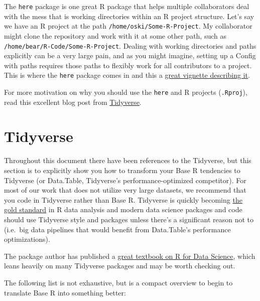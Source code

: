 \documentclass[
]{book}
\begin{document}
The \texttt{here} package is one great R package that helps multiple collaborators deal with the mess that is working directories within an R project structure. Let's say we have an R project at the path \texttt{/home/oski/Some-R-Project}. My collaborator might clone the repository and work with it at some other path, such as \texttt{/home/bear/R-Code/Some-R-Project}. Dealing with working directories and paths explicitly can be a very large pain, and as you might imagine, setting up a Config with paths requires those paths to flexibly work for all contributors to a project. This is where the \texttt{here} package comes in and this a \href{https://github.com/jennybc/here_here}{great vignette describing it}.

For more motivation on why you should use the \texttt{here} and R projects (\texttt{.Rproj}), read this excellent blog post from \href{https://www.tidyverse.org/articles/2017/12/workflow-vs-script/}{Tidyverse}.

\hypertarget{tidyverse}{%
\section{Tidyverse}\label{tidyverse}}

Throughout this document there have been references to the Tidyverse, but this section is to explicitly show you how to transform your Base R tendencies to Tidyverse (or Data.Table, Tidyverse's performance-optimized competitor). For most of our work that does not utilize very large datasets, we recommend that you code in Tidyverse rather than Base R. Tidyverse is quickly becoming \href{https://rviews.rstudio.com/2017/06/08/what-is-the-tidyverse/}{the gold standard} in R data analysis and modern data science packages and code should use Tidyverse style and packages unless there's a significant reason not to (i.e.~big data pipelines that would benefit from Data.Table's performance optimizations).

The package author has published a \href{https://r4ds.had.co.nz/}{great textbook on R for Data Science}, which leans heavily on many Tidyverse packages and may be worth checking out.

The following list is not exhaustive, but is a compact overview to begin to translate Base R into something better:
\end{document}
